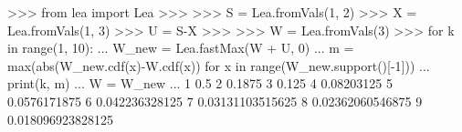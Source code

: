
>>> from lea import Lea
>>>
>>> S = Lea.fromVals(1,  2)
>>> X = Lea.fromVals(1,  3)
>>> U = S-X
>>>
>>> W = Lea.fromVals(3)
>>> for k in range(1, 10):
...     W_new = Lea.fastMax(W + U, 0)
...     m = max(abs(W_new.cdf(x)-W.cdf(x)) for x in
range(W_new.support()[-1]))
...     print(k, m)
...     W = W_new
...
1 0.5
2 0.1875
3 0.125
4 0.08203125
5 0.0576171875
6 0.042236328125
7 0.03131103515625
8 0.02362060546875
9 0.018096923828125


